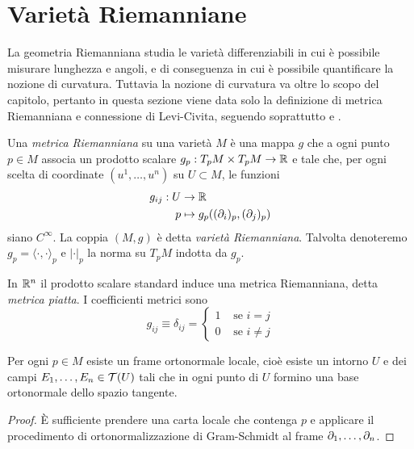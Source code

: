 	
	
	\section{Varietà Riemanniane}
	
	La geometria Riemanniana studia le varietà differenziabili in cui è possibile misurare lunghezza e angoli, e di conseguenza in cui è possibile quantificare la nozione di curvatura. Tuttavia la nozione di curvatura va oltre lo scopo del capitolo, pertanto in questa sezione viene data solo la definizione di metrica Riemanniana e connessione di Levi-Civita, seguendo soprattutto \cite[Chapter~8]{milnor1963morse} e \cite[Sezioni~6.5-6]{abate2011geometria}.
	
	\begin{defi}
		Una \textit{metrica Riemanniana} su una varietà \(M\) è una mappa \(g\) che a ogni punto \(p \in M\) associa un prodotto scalare \(g_p : T_p M \times T_pM \to \mathbb{R}\) e tale che, per ogni scelta di coordinate \((u^1,\dots, u^n)\) su \(U\subset M\), le funzioni
		\begin{align*}
			g_{ij}:U &\to \mathbb{R} \\
			p &\mapsto g_p((\partial_i)_p,(\partial_j)_p)
		\end{align*}
		siano \(C^\infty\). La coppia \((M,g)\) è detta \textit{varietà Riemanniana}. Talvolta denoteremo \(g_p = \langle \cdot,\cdot \rangle_p\) e \(| \cdot |_p\) la norma su \(T_pM\) indotta da \(g_p\). 
	\end{defi}
	
	\begin{es}\label{es: metrica piatta}
		In \(\mathbb{R}^n\) il prodotto scalare standard induce una metrica Riemanniana, detta \textit{metrica piatta}. I coefficienti metrici sono
		\[
			g_{ij} \equiv \delta_{ij} = \begin{cases}
				1 & \text{ se } i = j \\
				0 & \text{ se } i \neq j
			\end{cases}
		\]
	\end{es}
	
	\begin{lemma}\label{lemma: frame ortonormale}
		Per ogni \(p \in M\) esiste un frame ortonormale locale, cioè esiste un intorno \(U\) e dei campi \(E_1,\dots,E_n \in \mathcal{T}(U)\) tali che in ogni punto di \(U\) formino una base ortonormale dello spazio tangente. 
	\end{lemma}
	\begin{proof}
		È sufficiente prendere una carta locale che contenga \(p\) e applicare il procedimento di ortonormalizzazione di Gram-Schmidt al frame \(\partial_1, \dots,\partial_n\). 
	\end{proof}
	
